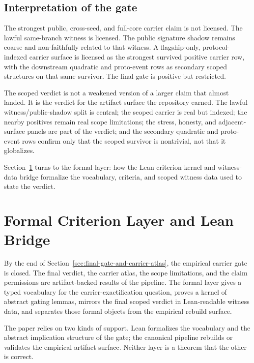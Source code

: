 \documentclass[11pt]{article}
\theoremstyle{definition}
\begin{document}
\subsection{Interpretation of the gate}

The strongest public, cross-seed, and full-core carrier claim is not licensed. The
lawful same-branch witness is licensed. The public signature shadow remains coarse
and non-faithfully related to that witness. A flagship-only, protocol-indexed carrier
surface is licensed as the strongest survived positive carrier row, with the
downstream quadratic and proto-event rows as secondary scoped structures on that
same survivor. The final gate is positive but restricted.

The scoped verdict is not a weakened version of a larger claim that almost landed. It
is the verdict for the artifact surface the repository earned. The lawful
witness/public-shadow split is central; the scoped carrier is real but indexed; the
nearby positives remain real scope limitations; the stress, honesty, and
adjacent-surface panels are part of the verdict; and the secondary quadratic and
proto-event rows confirm only that the scoped survivor is nontrivial, not that it
globalizes.

Section~\ref{sec:formal-and-lean-criterion-layer} turns to the formal layer: how the
Lean criterion kernel and witness-data bridge formalize the vocabulary, criteria, and
scoped witness data used to state the verdict.
 \section{Formal Criterion Layer and Lean Bridge}
\label{sec:formal-and-lean-criterion-layer}

By the end of Section~\ref{sec:final-gate-and-carrier-atlas}, the empirical carrier
gate is closed. The final verdict, the carrier atlas, the scope limitations, and the
claim permissions are artifact-backed results of the pipeline. The formal layer gives
a typed vocabulary for the carrier-exactification question, proves a kernel of
abstract gating lemmas, mirrors the final scoped verdict in Lean-readable witness
data, and separates those formal objects from the empirical rebuild surface.

The paper relies on two kinds of support. Lean formalizes the vocabulary and the
abstract implication structure of the gate; the canonical pipeline rebuilds or
validates the empirical artifact surface. Neither layer is a theorem that the other
is correct.
\end{document}
